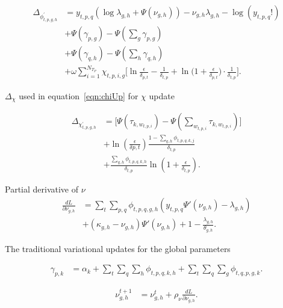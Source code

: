 \begin{align}
\Delta_{\phi^{'}_{t,p,g,h}} &= y_{t,p,q}( \log \! \lambda_{g,h} + 
\Psi(\nu_{g,h})) - \nu_{g,h} \lambda_{g,h} - \log \! (y_{t,p,q}!)
\nonumber \\ & + \Psi(\gamma_{p,g}) - \Psi(\sum_{g} \gamma_{p,g})
\nonumber \\  & + \Psi(\gamma_{q,h}) - \Psi(\sum_{h} \gamma_{q,h})
\nonumber \\  & + \omega\sum_{i=1}^{N_{T_{P}}} \! \chi_{t,p,i,g} 
\bigg[ \ln \! \frac{\epsilon}{\delta_{p,t}} - \frac{1}{\delta_{t,p}} 
+ \ln \bigg( 1 + \frac{\epsilon}{\delta_{p,t}} \bigg) 
\cdot \frac{1}{\delta_{t,p}} \bigg].
\label{eqn:phiDelta}
\end{align}

$\Delta_{\chi}$ used in equation~\ref{eqn:chiUp} for $\chi$ update

\begin{align}
\Delta_{\chi^{'}_{t,p,g,h}} &= \bigg[ \Psi(\tau_{k,w_{t,p,i}}) - 
\Psi(\sum_{w_{t,p,i}} \! \tau_{k, w_{t,p,i}}) \bigg]
\nonumber \\  & + \ln \! (\frac{\epsilon}{\delta{p,t}}) \frac{1 - 
\sum_{q,h} \! \phi_{t,p,q,k,j}}{\delta_{t,p}} 
\nonumber\\  & + \frac{\sum_{q,h} \phi_{t,p,q,k,h}}{\delta_{t,p}} 
\ln \! (1 + \frac{\epsilon}{\delta_{t,p}}).
\label{eqn:chiDelta}
\end{align}


Partial derivative of $\nu$
\begin{align}
\frac{dL}{\partial\nu_{g,h}} &= \sum_{t} \! \sum_{p,q} \! 
\phi_{t,p,q,g,h} (y_{t,p,q} \Psi'(\nu_{g,h}) - \lambda_{g,h})
\nonumber\\  & + (\kappa_{g,h} - \nu_{g,h})\Psi'(\nu_{g,h}) + 
1 - \frac{\lambda_{g,h}}{\theta_{g,h}}.
\label{eqn:partialNu}
\end{align}

The traditional variational updates for the global parameters

\begin{align}
\gamma_{p,k} &= \alpha_{k} + \sum_{t} \! \sum_{q} \! \sum_{h} \! \phi_{t,p,q,k,h} 
+ \sum_{t} \! \sum_{q} \! \sum_{g} \! \phi_{t,q,p,g,k}.
\label{eqn:gammaUp}
\end{align}

\begin{align}
\nu_{g,h}^{t+1} &= \nu_{g,h}^{t}+\rho_\nu \frac{dL}{\partial\nu_{g,h}}. 
\label{eqn:nuUp}
\end{align}

